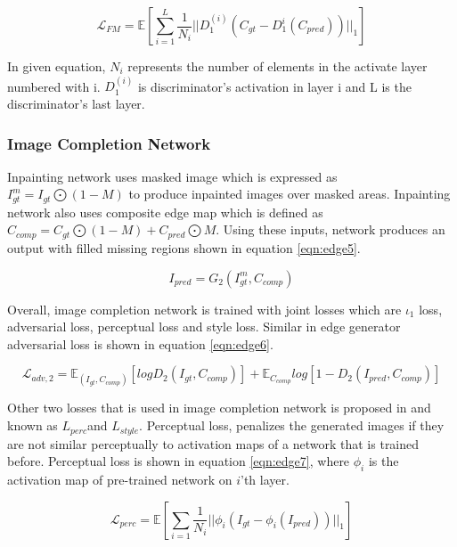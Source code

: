 \begin{equation}
\label{eqn:edge4}
    \mathcal{L}_{FM} = \mathbb{E} [ \sum\limits^L_{i=1}{\frac{1}{N_i}|| D_1^(i) (C_{gt}-D_1^{i} (C_{pred})) ||_1} ]
\end{equation}

In given equation, \(N_i\) represents the number of elements in the activate layer numbered with i. \(D_1^{(i)} \) is discriminator’s activation in layer i and L is the discriminator’s last layer.

\subsubsection{Image Completion Network}

Inpainting network uses masked image which is expressed as  \(I^m_{gt}=I_{gt} \bigodot(1-M)\) to produce inpainted images over masked areas. Inpainting network also uses composite edge map which is defined as \(C_{comp}=C_{gt}  \bigodot (1-M)+C_{pred}  \bigodot M.\) Using these inputs, network produces an output with filled missing regions shown in equation \ref{eqn:edge5}.

\begin{equation}
\label{eqn:edge5}
    I_{pred} = G_2 (I^m_{gt}, C_{comp})
\end{equation}

Overall, image completion network is trained with joint losses which are \(\iota_1\) loss, adversarial loss, perceptual loss and style loss. Similar in edge generator adversarial loss is shown in equation \ref{eqn:edge6}. 

\begin{equation}
\label{eqn:edge6}
    \mathcal{L}_{adv,2} = \mathbb{E}_{(I_{gt},C_{comp})}[logD_{2}(I_{gt},C_{comp})]+\mathbb{E}_{C_{comp}}log[1-D_{2} (I_{pred}, C_{comp})]
\end{equation}

Other two losses that is used in image completion network is proposed in \cite{style} and \cite{perceptual} known as \(L_{perc}\)\space and \space \(L_{style}\).  Perceptual loss, penalizes the generated images if they are not similar perceptually to activation maps of a network that is trained before. Perceptual loss is shown in equation \ref{eqn:edge7}, where \(\phi_i\) is the activation map of pre-trained network on \(i\)’th layer.

\begin{equation}
\label{eqn:edge7}
    \mathcal{L}_{perc} = \mathbb{E}[ \sum\limits_{i=1}\frac{1}{N_i} || \phi_i(I_{gt}-\phi_i (I_{pred}) ) ||_1 ]
\end{equation}

